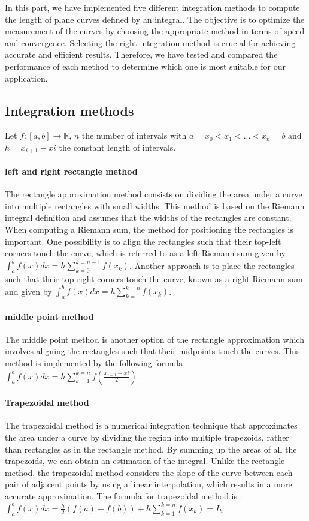 In this part, we have implemented five different integration methods to compute the length of plane curves defined by an integral. The objective is to optimize the measurement of the curves by choosing the appropriate method in terms of speed and convergence.
Selecting the right integration method is crucial for achieving accurate and efficient results. Therefore, we have tested and compared the performance of each method to determine which one is most suitable for our application.
\subsection{Integration methods}
Let $ f : [a,b] \rightarrow \mathbb{R} $, $n$ the number of intervals with $a = x_{0} < x_{1}< ...<x_{n} = b$ and $ h = x_{i+1} -x{i}$ the constant length of intervals.
\paragraph{left and right rectangle method}
The rectangle approximation method consists on dividing the area under a curve into multiple rectangles with small widths. This method is based on the Riemann integral definition and assumes that the widths of the rectangles are constant.
When computing a Riemann sum, the method for positioning the rectangles is important. One possibility is to align the rectangles such that their top-left corners touch the curve, which is referred to as a left Riemann sum given by $\int_{a}^{b}f(x)dx =  h\sum_{k=0}^{k=n-1} f(x_{k}) $.
Another approach is to place the rectangles such that their top-right corners touch the curve, known as a right Riemann sum and given by $\int_{a}^{b}f(x)dx =  h\sum_{k=1}^{k=n} f(x_{k}) $.
\paragraph{middle point method}
The middle point method is another option of the rectangle approximation which involves aligning the rectangles such that their midpoints touch the curves. This method is implemented by the following formula $\int_{a}^{b}f(x)dx =  h\sum_{k=1}^{k=n} f(\frac{x_{i-1} -x{i}}{2})$.
\paragraph{Trapezoidal method}
The trapezoidal method is a numerical integration technique that approximates the area under a curve by dividing the region into multiple trapezoids, rather than rectangles as in the rectangle method. By summing up the areas of all the trapezoids, we can obtain an estimation of the integral. Unlike the rectangle method, the trapezoidal method considers the slope of the curve between each pair of adjacent points by using a linear interpolation, which results in a more accurate approximation. The formula for trapezoidal method is :
$\int_{a}^{b}f(x)dx  = \frac{h}{2}(f(a) + f(b)) + h\sum_{k=1}^{k=n} f(x_{k}) = I_{h}$

